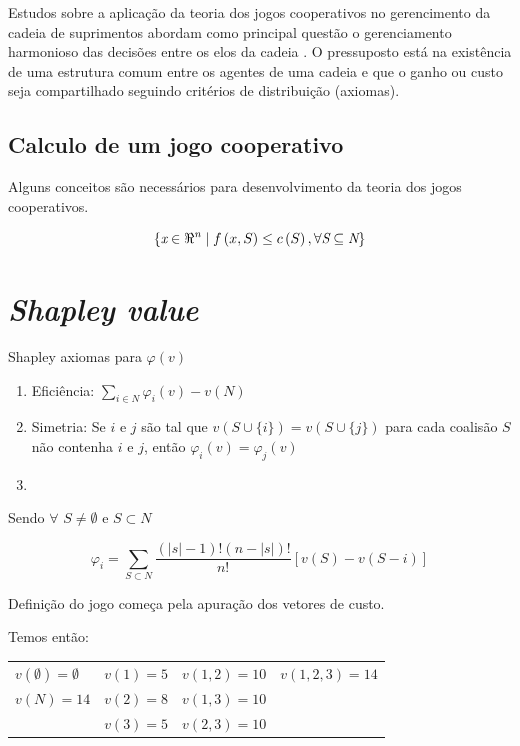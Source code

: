 \documentclass[
	article,			        %
	11pt,				          %
	oneside,			        %
	a4paper,			        %
	english,			        %
	brazil,				        %
	sumario=tradicional
]{abntex2}\usepackage[]{graphicx}\usepackage[]{color}
\begin{document}
Estudos sobre a aplicação da teoria dos jogos cooperativos no gerencimento da cadeia de suprimentos abordam como principal questão o gerenciamento harmonioso das decisões entre os elos da cadeia \cite{Dobos.2010}. O pressuposto está na existência de uma estrutura comum entre os agentes de uma cadeia e que o ganho ou custo seja compartilhado seguindo critérios de distribuição (axiomas)\cite{Bezerra.2009}.

\subsection{Calculo de um jogo cooperativo}

Alguns conceitos são necessários para desenvolvimento da teoria dos jogos cooperativos.

\begin{equation}
  \label{eq:conceitoTJC}
  \left \{ 
    \emph{x} \in \Re^{\emph{n}} \mid f\left ( x,S \right ) \leq c\left ( S \right ), \forall \emph{S} \subseteq \emph{N}
  \right\}
\end{equation}

\section{\emph{Shapley value}}

Shapley axiomas para $\varphi(v)$
\begin{enumerate}
  \item Eficiência: $\sum_{i \in N} \varphi_i(v) - v(N)$
  \item Simetria: Se $i$ e $j$ são tal que $v(S \cup \{i\}) = v(S \cup \{j\})$ para cada coalisão $S$ não contenha $i$ e $j$, então $\varphi_i (v) = \varphi_j (v)$
  \item 
\end{enumerate}

Sendo $\forall$ $S \neq \emptyset$ e $S \subset N$

\begin{equation}
  \label{eq:shaVal}
  \varphi _{i} = \sum_{S \subset N} \frac{(|s| - 1)!(n - |s|)!}{n!}[v(S)-v(S - i)]
\end{equation}

Definição do jogo começa pela apuração dos vetores de custo.

Temos então:

\begin{table}[!h]
  \centering
  \label{my-label}
  \begin{tabular}{llll}
    $v(\emptyset) = \emptyset$ & $v(1) = 5$ & $v(1, 2) = 10$ & $v(1, 2, 3) = 14$ \\
    $v(N) = 14$                & $v(2) = 8$ & $v(1, 3) = 10$ &                   \\
                               & $v(3) = 5$ & $v(2, 3) = 10$ &                  
  \end{tabular}
\end{table}
\end{document}
